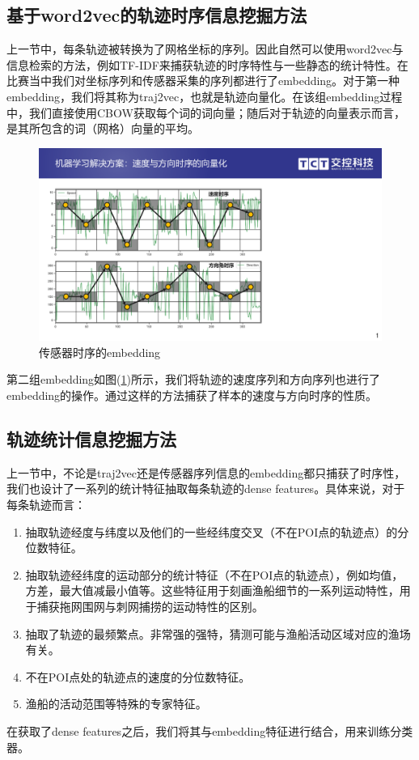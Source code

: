 \documentclass[UTF8, 12pt]{ctexart}
\begin{document}
		\subsection{基于word2vec的轨迹时序信息挖掘方法}
		上一节中，每条轨迹被转换为了网格坐标的序列。因此自然可以使用word2vec\cite{ChristopherD2010信息检索导论}\cite{Mikolov2013Distributed}与信息检索的方法，例如TF-IDF来捕获轨迹的时序特性与一些静态的统计特性。在比赛当中我们对坐标序列和传感器采集的序列都进行了embedding。对于第一种embedding，我们将其称为traj2vec，也就是轨迹向量化。在该组embedding过程中，我们直接使用CBOW获取每个词的词向量；随后对于轨迹的向量表示而言，是其所包含的词（网格）向量的平均。
		\begin{figure}[H]
			\centering
			\includegraphics[width=0.6\linewidth]{..//plots//sequence_encoding.pdf}
			\caption{传感器时序的embedding}
			\label{sec_2_sequence_encoding}
			\vspace{-0.2cm}
		\end{figure}
		第二组embedding如图(\ref{sec_2_sequence_encoding})所示，我们将轨迹的速度序列和方向序列也进行了embedding的操作。通过这样的方法捕获了样本的速度与方向时序的性质。

		\subsection{轨迹统计信息挖掘方法}
		上一节中，不论是traj2vec还是传感器序列信息的embedding都只捕获了时序性，我们也设计了一系列的统计特征抽取每条轨迹的dense features。具体来说，对于每条轨迹而言：
		\begin{enumerate}
			\item 抽取轨迹经度与纬度以及他们的一些经纬度交叉（不在POI点的轨迹点）的分位数特征。
			\item 抽取轨迹经纬度的运动部分的统计特征（不在POI点的轨迹点），例如均值，方差，最大值减最小值等。这些特征用于刻画渔船细节的一系列运动特性，用于捕获拖网围网与刺网捕捞的运动特性的区别。
			\item 抽取了轨迹的最频繁点。非常强的强特，猜测可能与渔船活动区域对应的渔场有关。
			\item 不在POI点处的轨迹点的速度的分位数特征。
			\item 渔船的活动范围等特殊的专家特征。
		\end{enumerate}
		在获取了dense features之后，我们将其与embedding特征进行结合，用来训练分类器。
\end{document}
